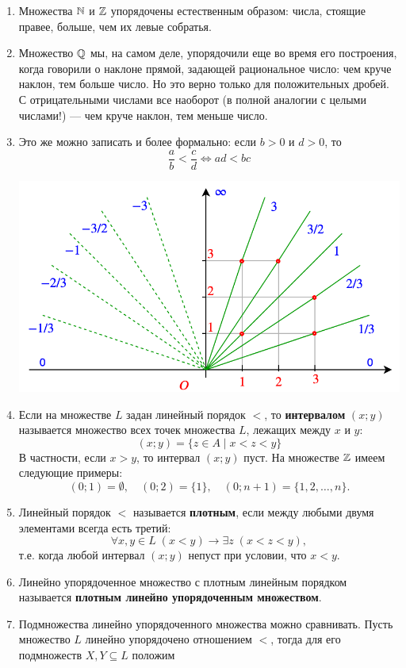 \begin{enumerate}
\item Множества $\mathbb N$ и $\mathbb Z$ упорядочены естественным образом: числа, стоящие правее, больше, чем их левые собратья.
\item Множество $\mathbb Q$ мы, на самом деле, упорядочили еще во время его построения, когда говорили о наклоне прямой, задающей рациональное число: чем круче наклон, тем больше число. Но это верно только для положительных дробей. С отрицательными числами все наоборот (в полной аналогии с целыми числами!) --- чем круче наклон, тем меньше число.
\item Это же можно записать и более формально: если $b>0$ и $d>0$, то
$$
\frac{a}{b}<\frac{c}{d}\Leftrightarrow ad<bc
$$
\begin{center}
\includegraphics[scale=0.3]{ratio.png}
\end{center}
\item Если на множестве $L$ задан линейный порядок $<$, то \textbf{интервалом} $(x;y)$ называется множество всех точек множества $L$, лежащих между $x$ и $y$:
$$
(x;y) = \{z\in A\mid x<z<y\}
$$
В частности, если $x>y$, то интервал $(x;y)$ пуст. На множестве $\mathbb Z$ имеем следующие примеры:
$$
(0;1) = \emptyset,\quad (0;2) = \{1\}, \quad (0;n+1) = \{1,2,\dots, n\}.
$$
\item Линейный порядок $<$ называется \textbf{плотным}, если между любыми двумя элементами всегда есть третий: 
$$
\forall x,y\in L\;(x<y)\to\exists z\; (x<z<y),
$$
т.е. когда любой интервал $(x;y)$ непуст при условии, что $x<y$.
\item Линейно упорядоченное множество с плотным линейным порядком называется \textbf{плотным линейно упорядоченным множеством}.
\item Подмножества линейно упорядоченного множества можно сравнивать. Пусть множество $L$ линейно упорядочено отношением $<$, тогда для его подмножеств $X,Y\subseteq L$ положим

\end{enumerate}
